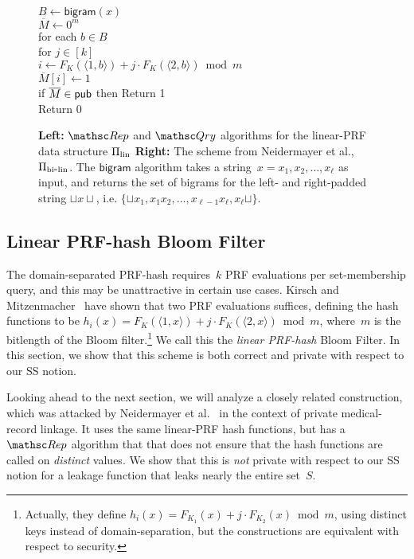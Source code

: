 \begin{figure}[tp]
{\medskip
{}\\
$B \gets \mathsf{bigram}(x)$\\
$\overline{M} \gets 0^m$\\
for each $b \in B$\\
\nudge for $j \in [k]$\\
\nudge\nudge $i \gets F_{K}(\langle 1,b \rangle)+j\cdot F_{K}(\langle 2,b \rangle) \bmod m$\\
\nudge\nudge $\overline{M}[i] \gets 1$\\
if $\overline{M} \in {\sf pub}$ then Return 1 \\
Return 0
}
\caption{{\bf Left:} $\Rep$ and $\Qry$ algorithms for the linear-PRF
  data structure $\Pi_{\mathrm{lin}}$ {\bf Right:}
The scheme from Neidermayer et al.\cite{xxx}, $\Pi_{\mathrm{bi}\mbox{-}\mathrm{lin}}$. The $\mathsf{bigram}$
algorithm takes a string~$x=x_1,x_2,\ldots,x_\ell$ as input, and
returns the set of bigrams for the left- and right-padded string
$\sqcup x \sqcup$, i.e. $\{\sqcup x_1, x_1x_2,\ldots,x_{\ell-1}x_\ell,x_\ell\sqcup\}$.
}
\label{fig:lin-and-bi-lin}
\label{fig:neidermayer}
\end{figure}

\subsection{Linear PRF-hash Bloom Filter }
The domain-separated PRF-hash requires~$k$ PRF evaluations per set-membership query, and this may be unattractive in certain use cases.  Kirsch and Mitzenmacher~\cite{xxx} have shown that two PRF evaluations suffices, defining the hash functions to be $h_i(x)=F_K(\langle 1,x \rangle) + j\cdot F_K(\langle 2,x \rangle) \bmod m$, where~$m$ is the bitlength of the Bloom filter.\footnote{Actually, they define $h_i(x)=F_{K_1}(x)  + j\cdot F_{K_2}(x) \bmod m$, using distinct keys instead of domain-separation, but the constructions are equivalent with respect to security.} We call this the \emph{linear PRF-hash} Bloom Filter.  In this section, we show that this scheme is both correct and private with respect to our SS notion.

Looking ahead to the next section, we will analyze a closely related construction, which was attacked by Neidermayer et al.~\cite{xxx} in the context of private medical-record linkage.  It uses the same linear-PRF hash functions, but has a $\Rep$ algorithm that that does not ensure that the hash functions are called on \emph{distinct} values.  We show that this is \emph{not} private with respect to our SS notion for a leakage function that leaks nearly the entire set~$S$. 

